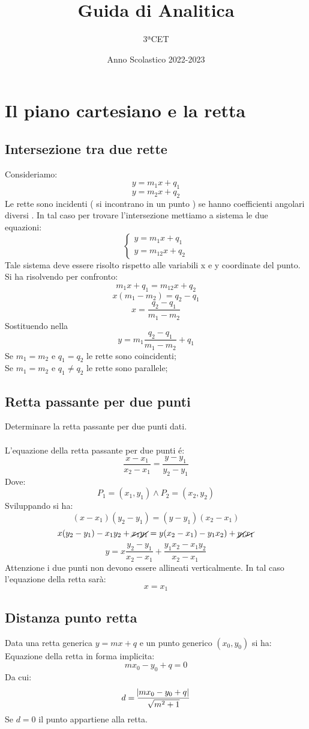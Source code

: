 \documentclass[12pt]{book}
\title{Guida di Analitica}
\author{3ªCET}
\date{Anno Scolastico 2022-2023}
\begin{document}
  
	\maketitle 
	\tableofcontents
	\newpage
	\chapter{Il piano cartesiano e la retta}
		\section{Intersezione tra due rette}
			Consideriamo:
				\[ y=m_1 x+q_1 \]
				\[ y=m_2 x+q_2 \]
			Le rette sono incidenti ( si incontrano in un punto ) se hanno coefficienti angolari diversi . In tal caso per trovare l’intersezione mettiamo a sistema le due equazioni:
				$$\begin{cases}
					 y=m_1 x+q_1 \\
					 y=m_12 x+q_2 
				\end{cases} $$
			Tale sistema deve essere risolto rispetto alle variabili x e y coordinate del punto. Si ha risolvendo per confronto:
				\[ m_1 x+q_1=m_12 x+q_2 \]
				\[x(m_1-m_2)=q_2-q_1\]
				\[x=\frac{q_2-q_1}{m_1-m_2}\]
			Sostituendo nella
				\[y=m_1\frac{q_2-q_1}{m_1-m_2}+q_1\]
			Se $m_1=m_2$ e $q_1=q_2$ le rette sono coincidenti;\\
			Se $m_1=m_2$ e $q_1\neq q_2$ le rette sono parallele;
	
		\section{Retta passante per due punti}
			Determinare la retta passante per due punti dati.\\ \\
			L'equazione della retta passante per due punti é:
				\[\frac{x-x_1}{x_2-x_1}=\frac{y-y_1}{y_2-y_1}\]
			Dove:
			\[P_1=(x_1,y_1)\land P_2=(x_2,y_2)\]
			Sviluppando si ha:
			\[(x-x_1)(y_2-y_1)=(y-y_1)(x_2-x_1)\]
			\[x(y_2-y_1)-x_1y_2+\cancel{x_1}\cancel{y_1}=
			y(x_2-x_1)-y_1x_2)+\cancel{y_1}\cancel{x_1}\]
			\[y=x\frac{y_2-y_1}{x_2-x_1}+
			\frac{y_1x_2-x_1y_2}{x_2-x_1}\]
			Attenzione i due punti non devono essere allineati verticalmente. In tal caso l’equazione della retta sarà:
			\[x=x_1\]
			
		\section{Distanza punto retta}
			Data una retta generica $y=mx+q$ e un punto generico $(x_0,y_0)$ si ha:
			Equazione della retta in forma implicita:
			\[mx_0-y_0+q=0\]
			Da cui:
			\[d=\frac{\abs{mx_0-y_0+q}}{\sqrt{m^2+1}}\]
			Se $d=0$ il punto appartiene alla retta.
		
\end{document}
